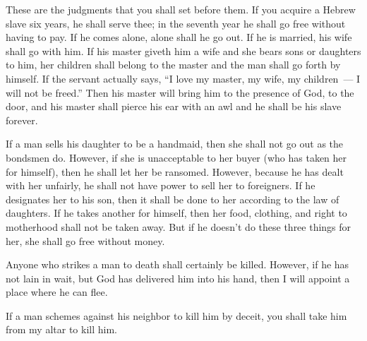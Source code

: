
\begin{inparaenum}
     These are the judgments that you shall set before them.%
     If you acquire a Hebrew slave six years, he shall serve thee; in the seventh year he shall go free without having to pay.%
     If he comes alone, alone shall he go out. If he is married, his wife shall go with him.%
     If his master giveth him a wife and she bears sons or daughters to him, her children shall belong to the master and the man shall go forth by himself.%
     If the servant actually says, ``I love my master, my wife, my children~--- I will not be freed.''%
     Then his master will bring him to the presence of God, to the door, and his master shall pierce his ear with an awl and he shall be his slave forever.%
    
     If a man sells his daughter to be a handmaid, then she shall not go out as the bondsmen do.%
     However, if she is unacceptable to her buyer (who has taken her for himself), then he shall let her be ransomed. However, because he has dealt with her unfairly, he shall not have power to sell her to foreigners.%
     If he designates her to his son, then it shall be done to her according to the law of daughters.%
     If he takes another for himself, then her food, clothing, and right to motherhood shall not be taken away.%
     But if he doesn't do these three things for her, she shall go free without money.%
    
     Anyone who strikes a man to death shall certainly be killed.%
     However, if he has not lain in wait, but God has delivered him into his hand, then I will appoint a place where he can flee.%
    
     If a man schemes against his neighbor to kill him by deceit, you shall take him from my altar to kill him.%
    

\end{inparaenum}
